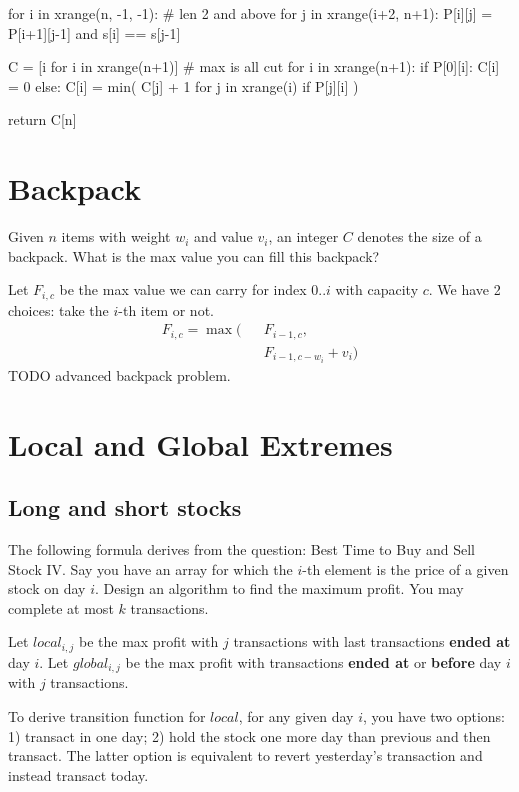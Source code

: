 {\begin{python}
  for i in xrange(n, -1, -1):  # len 2 and above
    for j in xrange(i+2, n+1):
      P[i][j] = P[i+1][j-1] and s[i] == s[j-1]

  C = [i for i in xrange(n+1)]  # max is all cut
  for i in xrange(n+1):
    if P[0][i]:
      C[i] = 0
    else:
      C[i] = min(
          C[j] + 1
          for j in xrange(i)
          if P[j][i]
      )

  return C[n]
\end{python}
\section{Backpack}
Given $n$ items with weight $w_i$ and value $v_i$, an integer $C$ denotes the size of a backpack. What is the max value you can fill this backpack?

Let $F_{i, c}$ be the max value we can carry for index $0..i$ with capacity $c$. We have 2 choices: take the $i$-th item or not.
\begin{eqnarray*}
F_{i, c}= \max\big(&&F_{i-1, c}, \\
&&F_{i-1, c-w_i}+v_i\big)
\end{eqnarray*}
TODO advanced backpack problem. 

\section{Local and Global Extremes}
\subsection{Long and short stocks}
The following formula derives from the question: Best Time to Buy and Sell Stock IV. Say you have an array for which the $i$-th element is the price of a given stock on day $i$. Design an algorithm to find the maximum profit. You may complete at most $k$ transactions. 

Let $local_{i, j}$ be the max profit with $j$ transactions with last transactions \textbf{ended at} day $i$. Let $global_{i, j}$ be the max profit with transactions \textbf{ended at} or \textbf{before} day $i$ with $j$ transactions. 

To derive transition function for $local$, for any given day $i$, you have two options: 1) transact in one day; 2) hold the stock one more day than previous and then transact. The latter option is equivalent to revert yesterday's transaction and instead transact today. 

}

